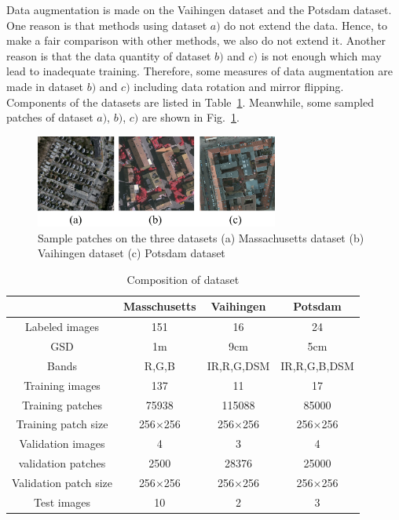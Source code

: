 Data augmentation is made on the Vaihingen dataset and the Potsdam dataset.
One reason is that methods using dataset ${a)}$ do not extend the data.
Hence, to make a fair comparison with other methods, we also do not extend it.
Another reason is that the data quantity of dataset ${b)}$ and ${c)}$ is not enough which may lead to inadequate training.
Therefore, some measures of data augmentation are made in dataset ${b)}$ and ${c)}$ including data rotation and mirror flipping.
Components of the datasets are listed in Table~\ref{table:dataset-composition}.
Meanwhile, some sampled patches of dataset ${a)}$, ${b)}$, ${c)}$ are shown in Fig.~\ref{fig:dataset_sample}.


\begin{figure}
\centering
\includegraphics[width=8cm]{Figures/datasets.eps}
\caption{Sample patches on the three datasets  (a) Massachusetts dataset (b) Vaihingen dataset (c) Potsdam dataset}
\label{fig:dataset_sample}
\end{figure}

\begin{table}
 \centering
 \caption{Composition of dataset}
 \label{table:dataset-composition}
 \begin{tabular}{c|ccc}
\hline
& Masschusetts & Vaihingen & Potsdam\\  \hline
Labeled images & 151& 16 &24\\ \hline
GSD & 1m & 9cm & 5cm\\ \hline
Bands & R,G,B & IR,R,G,DSM & IR,R,G,B,DSM\\ \hline
Training images &137 & 11 & 17\\ \hline
Training patches&75938 &115088 &85000\\ \hline
Training patch size& 256$\times$256 & 256$\times$256 & 256$\times$256\\ \hline
Validation images & 4 & 3 & 4\\ \hline
validation patches &2500 & 28376 &25000 \\\hline
Validation patch size & 256$\times$256 & 256$\times$256 & 256$\times$256\\ \hline
Test images & 10 & 2 & 3\\ \hline
\end{tabular}
\end {table}



